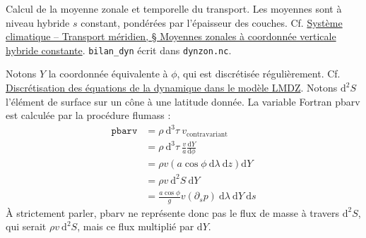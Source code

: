 \documentclass[a4paper,english,french]{article}
\newcommand{\ud}{\mathrm{d}}
\begin{document}
Calcul de la moyenne zonale et temporelle du transport. Les moyennes
sont à niveau hybride $s$ constant, pondérées par l'épaisseur des
couches. Cf.
\hyperref{../../../../Apprentissage/Climate/Meridional_transport_texfol/meridional_transport.pdf}{sec}{moyenne_s_constant}{Système
  climatique – Transport méridien, § Moyennes zonales à coordonnée
  verticale hybride constante}. \verb+bilan_dyn+ écrit dans
\verb+dynzon.nc+.

Notons $Y$ la coordonnée équivalente à $\phi$, qui est discrétisée
régulièrement. Cf. \href{../../../Documentation_LMDZ/Dynamics_texfol/dynamics.pdf}{Discrétisation
  des équations de la dynamique dans le modèle LMDZ}. Notons $\ud^2 S$
l'élément de surface sur un cône à une latitude donnée. La variable
Fortran pbarv est calculée par la procédure flumass :
\begin{align*}
  \mathtt{pbarv} & = \rho\ \ud^3 \tau\ v_\mathrm{contravariant} \\
  & = \rho\ \ud^3 \tau\ \frac{v}{a} \frac{\ud Y}{\ud \phi} \\
  & = \rho v (a \cos \phi\ \ud \lambda\ \ud z) \ud Y \\
  & = \rho v\ \ud^2 S\ \ud Y \\
  & = \frac{a \cos \phi}{g} v (\partial_s p)\ \ud \lambda\ \ud Y\ \ud s
\end{align*}
\`A strictement parler, pbarv ne représente donc pas le flux de masse
à travers $\ud^2 S$, qui serait $\rho v\ \ud^2 S$, mais ce flux
multiplié par $\ud Y$.
\end{document}
